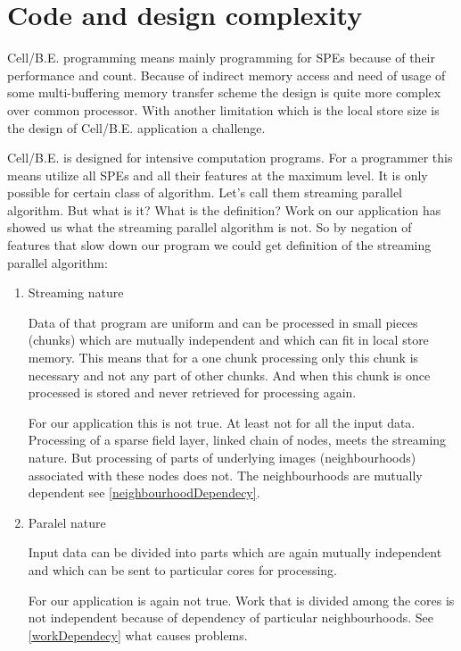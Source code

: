 \section{Code and design complexity}

\par
\mbox{Cell/B.E.} programming means mainly programming for SPEs because of their performance and count.
Because of indirect memory access and need of usage of some multi-buffering memory transfer scheme the design is quite more complex over common processor.
With another limitation which is the local store size is the design of \mbox{Cell/B.E.} application a challenge.

\par
\mbox{Cell/B.E.} is designed for intensive computation programs.
For a programmer this means utilize all SPEs and all their features at the maximum level.
It is only possible for certain class of algorithm.
Let's call them streaming parallel algorithm.
But what is it? What is the definition?
Work on our application has showed us what the streaming parallel algorithm is not.
So by negation of features that slow down our program we could get definition of the streaming parallel algorithm:
\begin{enumerate}

\item{Streaming nature}
\par
Data of that program are uniform and can be processed in small pieces (chunks) which are mutually independent and which can fit in local store memory.
This means that for a one chunk processing only this chunk is necessary and not any part of other chunks.
And when this chunk is once processed is stored and never retrieved for processing again.

\par
For our application this is not true.
At least not for all the input data.
Processing of a sparse field layer, linked chain of nodes, meets the streaming nature.
But processing of parts of underlying images (neighbourhoods) associated with these nodes does not.
The neighbourhoods are mutually dependent see \ref{neighbourhoodDependecy}.

\item{Paralel nature}
\par
Input data can be divided into parts which are again mutually independent and which can be sent to particular cores for processing.

\par
For our application is again not true.
Work that is divided among the cores is not independent because of dependency of particular neighbourhoods.
See \ref{workDependecy} what causes problems.

\end{enumerate}

